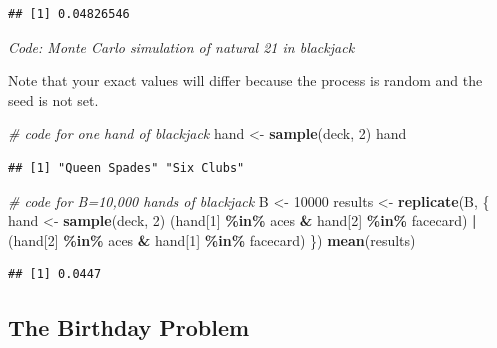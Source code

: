 \documentclass[
]{article}
\newenvironment{Shaded}{\begin{snugshade}}{\end{snugshade}}
\newcommand{\CommentTok}[1]{\textcolor[rgb]{0.56,0.35,0.01}{\textit{#1}}}
\newcommand{\DecValTok}[1]{\textcolor[rgb]{0.00,0.00,0.81}{#1}}
\newcommand{\KeywordTok}[1]{\textcolor[rgb]{0.13,0.29,0.53}{\textbf{#1}}}
\newcommand{\NormalTok}[1]{#1}
\newcommand{\OperatorTok}[1]{\textcolor[rgb]{0.81,0.36,0.00}{\textbf{#1}}}
\newcommand{\StringTok}[1]{\textcolor[rgb]{0.31,0.60,0.02}{#1}}
\begin{document}
\begin{verbatim}
## [1] 0.04826546
\end{verbatim}

\emph{Code: Monte Carlo simulation of natural 21 in blackjack}

Note that your exact values will differ because the process is random
and the seed is not set.

\begin{Shaded}
\begin{Highlighting}[]
\CommentTok{\# code for one hand of blackjack}
\NormalTok{hand \textless{}{-}}\StringTok{ }\KeywordTok{sample}\NormalTok{(deck, }\DecValTok{2}\NormalTok{)}
\NormalTok{hand}
\end{Highlighting}
\end{Shaded}

\begin{verbatim}
## [1] "Queen Spades" "Six Clubs"
\end{verbatim}

\begin{Shaded}
\begin{Highlighting}[]
\CommentTok{\# code for B=10,000 hands of blackjack}
\NormalTok{B \textless{}{-}}\StringTok{ }\DecValTok{10000}
\NormalTok{results \textless{}{-}}\StringTok{ }\KeywordTok{replicate}\NormalTok{(B, \{}
\NormalTok{  hand \textless{}{-}}\StringTok{ }\KeywordTok{sample}\NormalTok{(deck, }\DecValTok{2}\NormalTok{)}
\NormalTok{  (hand[}\DecValTok{1}\NormalTok{] }\OperatorTok{\%in\%}\StringTok{ }\NormalTok{aces }\OperatorTok{\&}\StringTok{ }\NormalTok{hand[}\DecValTok{2}\NormalTok{] }\OperatorTok{\%in\%}\StringTok{ }\NormalTok{facecard) }\OperatorTok{|}\StringTok{ }\NormalTok{(hand[}\DecValTok{2}\NormalTok{] }\OperatorTok{\%in\%}\StringTok{ }\NormalTok{aces }\OperatorTok{\&}\StringTok{ }\NormalTok{hand[}\DecValTok{1}\NormalTok{] }\OperatorTok{\%in\%}\StringTok{ }\NormalTok{facecard)}
\NormalTok{\})}
\KeywordTok{mean}\NormalTok{(results)}
\end{Highlighting}
\end{Shaded}

\begin{verbatim}
## [1] 0.0447
\end{verbatim}

\hypertarget{the-birthday-problem}{%
\subsection{The Birthday Problem}\label{the-birthday-problem}}
\end{document}
